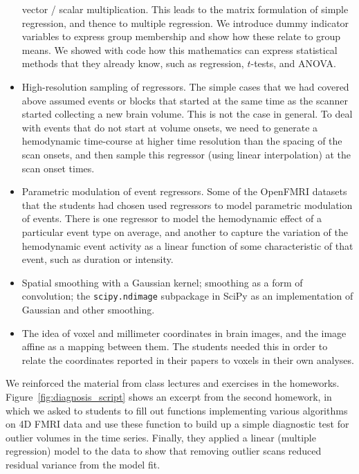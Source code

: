 \begin{itemize}
        vector / scalar multiplication.  This leads to the matrix formulation
        of simple regression, and thence to multiple regression.  We introduce
        dummy indicator variables to express group membership and show how
        these relate to group means.  We showed with code how this mathematics
        can express statistical methods that they already know, such as
        regression, $t$-tests, and ANOVA.
\item
    High-resolution sampling of regressors.  The simple cases that we had
        covered above assumed events or blocks that started at the same time
        as the scanner started collecting a new brain volume.  This is not the
        case in general.  To deal with events that do not start at volume
        onsets, we need to generate a hemodynamic time-course at higher
        time resolution than the spacing of the scan onsets, and then sample
        this regressor (using linear interpolation) at the scan onset times.
\item
    Parametric modulation of event regressors.  Some of the OpenFMRI datasets
        that the students had chosen used regressors to model parametric
        modulation of events.  There is one regressor to model the hemodynamic
        effect of a particular event type on average, and another to capture
        the variation of the hemodynamic event activity as a linear function
        of some characteristic of that event, such as duration or intensity.
\item
    Spatial smoothing with a Gaussian kernel; smoothing as a form of
    convolution; the \texttt{scipy.ndimage} subpackage in SciPy as an
    implementation of Gaussian and other smoothing.

\item
    The idea of voxel and millimeter coordinates in brain images, and the
    image affine as a mapping between them.  The students needed this in order
    to relate the coordinates reported in their papers to voxels in their own
    analyses.

\end{itemize}

We reinforced the material from class lectures and exercises in the homeworks.
Figure~\ref{fig:diagnosis_script} shows an excerpt from the second homework,
in which we asked to students to fill out functions implementing various
algorithms on 4D FMRI data and use these function to build up a simple
diagnostic test for outlier volumes in the time series.  Finally, they
applied a linear (multiple regression) model to the data to show that removing
outlier scans reduced residual variance from the model fit.

